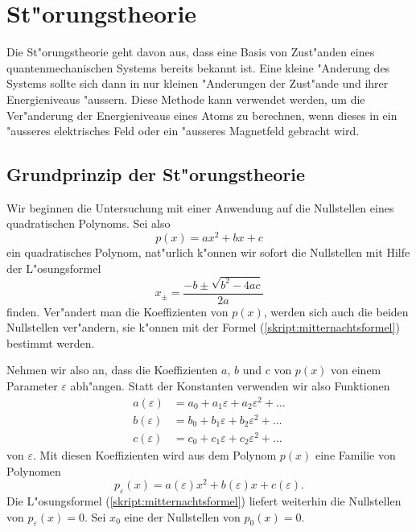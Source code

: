 \chapter{St"orungstheorie\label{chapter:stoerungstheorie}}
\rhead{}
Die St"orungstheorie geht davon aus, dass eine Basis von Zust"anden eines
quantenmechanischen Systems bereits bekannt ist. Eine kleine
"Anderung des Systems sollte sich dann in nur kleinen "Anderungen
der Zust"ande und ihrer Energieniveaus "aussern.
Diese Methode kann verwendet werden, um die Ver"anderung der Energieniveaus
eines Atoms zu berechnen, wenn dieses in ein "ausseres elektrisches Feld
oder ein "ausseres Magnetfeld gebracht wird.

\section{Grundprinzip der St"orungstheorie}
Wir beginnen die Untersuchung mit einer Anwendung auf die Nullstellen
eines quadratischen Polynoms. Sei also
\[
p(x) = ax^2 + bx + c
\]
ein quadratisches Polynom, nat"urlich k"onnen wir sofort die Nullstellen
mit Hilfe der L"osungsformel
\begin{equation}
x_{\pm}=\frac{-b\pm\sqrt{b^2-4ac}}{2a}
\label{skript:mitternachtsformel}
\end{equation}
finden.  Ver"andert man die Koeffizienten von $p(x)$, werden sich auch
die beiden Nullstellen ver"andern, sie k"onnen mit der Formel
(\ref{skript:mitternachtsformel}) bestimmt werden.

Nehmen wir also an, dass die Koeffizienten $a$, $b$ und $c$ von $p(x)$
von einem Parameter $\varepsilon$ abh"angen. Statt der Konstanten verwenden
wir also Funktionen
\begin{align*}
a(\varepsilon)&=a_0+a_1\varepsilon+a_2\varepsilon^2+\dots\\
b(\varepsilon)&=b_0+b_1\varepsilon+b_2\varepsilon^2+\dots\\
c(\varepsilon)&=c_0+c_1\varepsilon+c_2\varepsilon^2+\dots
\end{align*}
von $\varepsilon$. Mit diesen Koeffizienten wird aus dem Polynom $p(x)$
eine Familie von Polynomen
\[
p_\varepsilon(x)=a(\varepsilon)x^2 + b(\varepsilon)x+c(\varepsilon).
\]
Die L"osungsformel (\ref{skript:mitternachtsformel}) liefert weiterhin die
Nullstellen von $p_{\varepsilon}(x)=0$.
Sei $x_0$ eine der Nullstellen von $p_0(x) = 0$.

